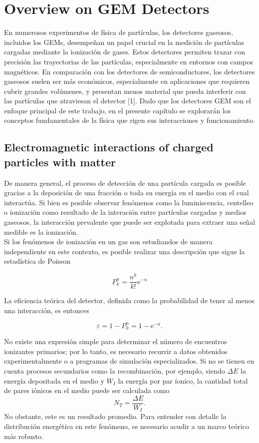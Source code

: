 \documentclass[]{book}
\begin{document}
\chapter*{Overview on GEM Detectors}

En numerosos experimentos de física de partículas, los detectores gaseosos, incluidos los GEMs, desempeñan un papel crucial en la medición de partículas cargadas mediante la ionización de gases. Estos detectores permiten trazar con precisión las trayectorias de las partículas, especialmente en entornos con campos magnéticos. En comparación con los detectores de semiconductores, los detectores gaseosos suelen ser más económicos, especialmente en aplicaciones que requieren cubrir grandes volúmenes, y presentan menos material que pueda interferir con las partículas que atraviesan el detector [1]. Dado que los detectores GEM son el enfoque principal de este trabajo, en el presente capítulo se explorarán los conceptos fundamentales de la física que rigen sus interacciones y funcionamiento.

\section{Electromagnetic interactions of charged particles with matter}

\noindent De manera general, el proceso de detección de una partícula cargada es posible gracias a la deposición de una fracción o toda su energía en el medio con el cual interactúa. Si bien es posible observar fenómenos como la luminiscencia, centelleo o ionización como resultado de la interación entre partículas cargadas y medios gaseosos, la interacción prevalente que puede ser explotada para extraer una señal medible es la ionización.\\

\noindent Si los fenómenos de ionización en un gas son estudiandos de manera independiente en este contexto, es posible realizar una descripción que sigue la estadística de Poisson

$$
P_k^n=\frac{n^k}{k!} \mathrm{e}^{-n}
$$

\noindent La eficiencia teórica del detector, definida como la probabilidad de tener al menos una interacción, es entonces

$$
\varepsilon=1-P_0^n=1-\mathrm{e}^{-n} .
$$

\noindent No existe una expresión simple para determinar el número de encuentros ionizantes primarios; por lo tanto, es necesario recurrir a datos obtenidos experimentalmente o a programas de simulación especializados. Si no se tienen en cuenta procesos secundarios como la recombinación, por ejemplo, siendo $\Delta E$ la energía depositada en el medio y $W_{I}$ la energía por par íonico, la cantidad total de pares iónicos en el medio puede ser calculada como $$N_{T} = \frac{\Delta E}{W_{I}}.$$No obstante, este es un resultado promedio. Para entender con detalle la distribución energética en este fenómeno, es necesario acudir a un marco teórico más robusto.
\end{document}
